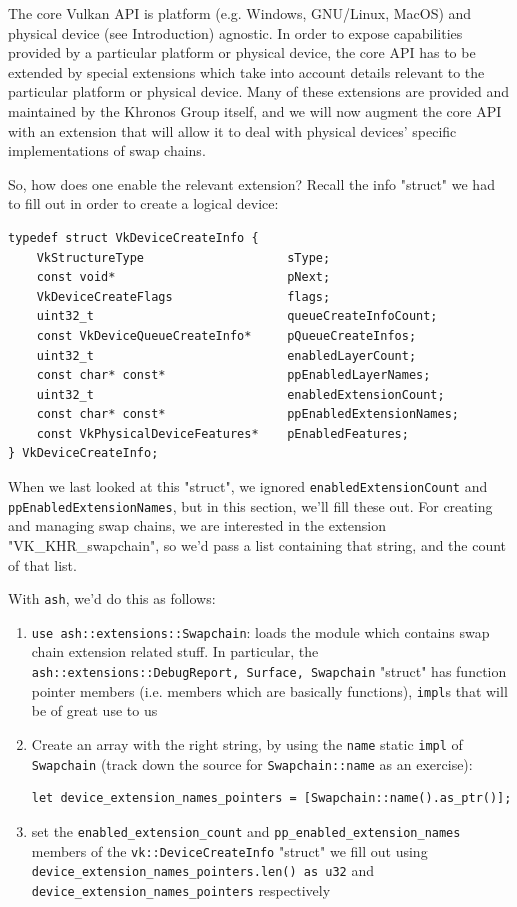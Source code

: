 \documentclass[12pt,letterpaper]{article}
\newcommand{\ril}[1]{\texttt{#1}}
\newcommand{\cil}[1]{\texttt{#1}}
\newcommand{\ash}{\texttt{ash}}
\begin{document}
	The core Vulkan API is platform (e.g. Windows, GNU/Linux, MacOS) and physical device (see Introduction) agnostic. In order to expose capabilities provided by a particular platform or physical device, the core API has to be extended by special extensions which take into account details relevant to the particular platform or physical device. Many of these extensions are provided and maintained by the Khronos Group itself, and we will now augment the core API with an extension that will allow it to deal with physical devices' specific implementations of swap chains. 
	
	So, how does one enable the relevant extension? Recall the info "struct" we had to fill out in order to create a logical device:
\begin{verbatim}
typedef struct VkDeviceCreateInfo {
	VkStructureType                    sType;
	const void*                        pNext;
	VkDeviceCreateFlags                flags;
	uint32_t                           queueCreateInfoCount;
	const VkDeviceQueueCreateInfo*     pQueueCreateInfos;
	uint32_t                           enabledLayerCount;
	const char* const*                 ppEnabledLayerNames;
	uint32_t                           enabledExtensionCount;
	const char* const*                 ppEnabledExtensionNames;
	const VkPhysicalDeviceFeatures*    pEnabledFeatures;
} VkDeviceCreateInfo;
\end{verbatim}
	When we last looked at this "struct", we ignored \cil{enabledExtensionCount} and \cil{ppEnabledExtensionNames}, but in this section, we'll fill these out. For creating and managing swap chains, we are interested in the extension "VK\_KHR\_swapchain", so we'd pass a list containing that string, and the count of that list. 
	
	With \ash, we'd do this as follows:
		\begin{enumerate}
			\item \ril{use ash::extensions::Swapchain}: loads the module which contains swap chain extension related stuff. In particular, the \ril{ash::extensions::{DebugReport, Surface, Swapchain}} "struct" has function pointer members (i.e. members which are basically functions), \ril{impl}s that will be of great use to us
				
			\item Create an array with the right string, by using the \ril{name} static \ril{impl} of \ril{Swapchain} (track down the source for \ril{Swapchain::name} as an exercise): 
\begin{verbatim}
let device_extension_names_pointers = [Swapchain::name().as_ptr()];
\end{verbatim}
			
			\item set the \ril{enabled_extension_count} and \ril{pp_enabled_extension_names} members of the \ril{vk::DeviceCreateInfo} "struct" we fill out using \ril{device_extension_names_pointers.len() as u32} and \ril{device_extension_names_pointers} respectively
		\end{enumerate}
	
\end{document}
